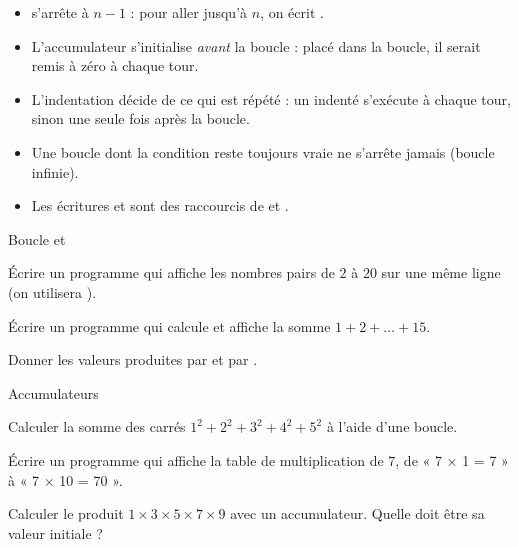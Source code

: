 \begin{attention}
\begin{itemize}[label={\color{otOrange}\textbullet},leftmargin=1.4em,itemsep=0.6mm,topsep=0.5mm]
  \item {} s'arrête à $n-1$ : pour aller jusqu'à $n$, on écrit .
  \item L'accumulateur s'initialise \emph{avant} la boucle : placé dans la boucle, il serait remis à zéro à chaque tour.
  \item L'indentation décide de ce qui est répété : un  indenté s'exécute à chaque tour, sinon une seule fois après la boucle.
  \item Une boucle  dont la condition reste toujours vraie ne s'arrête jamais (boucle infinie).
  \item Les écritures  et  sont des raccourcis de  et .
\end{itemize}
\end{attention}

\exercices
{}

\begin{exercice}[1]{Boucle  et }
\begin{questions}
  \item Écrire un programme qui affiche les nombres pairs de $2$ à $20$ sur une même ligne (on utilisera ).
  \item Écrire un programme qui calcule et affiche la somme $1+2+\dots+15$.
  \item Donner les valeurs produites par  et par .
\end{questions}
\end{exercice}

\begin{exercice}[1]{Accumulateurs}
\begin{questions}
  \item Calculer la somme des carrés $1^{2}+2^{2}+3^{2}+4^{2}+5^{2}$ à l'aide d'une boucle.
  \item Écrire un programme qui affiche la table de multiplication de $7$, de « 7 × 1 = 7 » à « 7 × 10 = 70 ».
  \item Calculer le produit $1\times3\times5\times7\times9$ avec un accumulateur. Quelle doit être sa valeur initiale ?
\end{questions}
\end{exercice}

